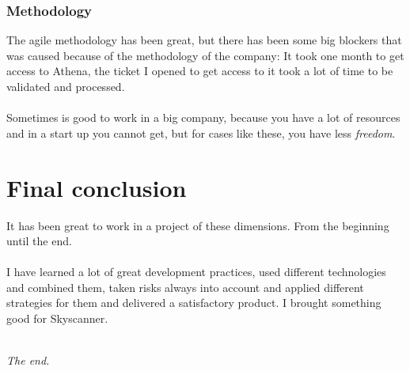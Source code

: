 \subsubsection*{Methodology}

The agile methodology has been great, but there has been some big blockers that was caused because of the methodology of the company: It took one month to get access to Athena, the ticket I opened to get access to it took a lot of time to be validated and processed.
\\\\
Sometimes is good to work in a big company, because you have a lot of resources and in a start up you cannot get, but for cases like these, you have less \textit{freedom}.

\section{Final conclusion}

It has been great to work in a project of these dimensions. From the beginning until the end.
\\\\
I have learned a lot of great development practices, used different technologies and combined them, taken risks always into account and applied different strategies for them and delivered a satisfactory product. I brought something good for Skyscanner.
\\\\
\begin{center}
\textit{The end.}
\end{center}

